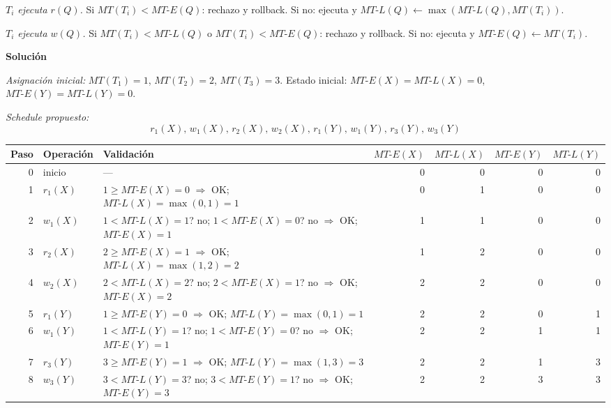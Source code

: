 \documentclass[11pt,a4paper]{article}
\newcommand{\itemcabecera}[1]{\noindent\textbf{#1}\par\medskip}
\newcommand{\bloqueSolucion}{\itemcabecera{Soluci\'on}}
\begin{document}
\textit{$T_i$ ejecuta $r(Q)$.} Si $MT(T_i) < MT\text{-}E(Q)$: rechazo y rollback. Si no: ejecuta y $MT\text{-}L(Q) \gets \max(MT\text{-}L(Q), MT(T_i))$.

\textit{$T_i$ ejecuta $w(Q)$.} Si $MT(T_i) < MT\text{-}L(Q)$ o $MT(T_i) < MT\text{-}E(Q)$: rechazo y rollback. Si no: ejecuta y $MT\text{-}E(Q) \gets MT(T_i)$.

\bloqueSolucion

\textit{Asignación inicial:} $MT(T_1) = 1$, $MT(T_2) = 2$, $MT(T_3) = 3$. Estado inicial: $MT\text{-}E(X) = MT\text{-}L(X) = 0$, $MT\text{-}E(Y) = MT\text{-}L(Y) = 0$.

\textit{Schedule propuesto:}
\[
r_1(X),\, w_1(X),\, r_2(X),\, w_2(X),\, r_1(Y),\, w_1(Y),\, r_3(Y),\, w_3(Y)
\]

\begin{center}
\begin{tabular}{r l l rrrr}
\toprule
\multicolumn{1}{c}{Paso} & Operación & Validación &
$\!MT\text{-}E(X)\!$ & $\!MT\text{-}L(X)\!$ & $\!MT\text{-}E(Y)\!$ & $\!MT\text{-}L(Y)\!$ \\
\midrule
0 & inicio       & ---                                                        & 0 & 0 & 0 & 0 \\
1 & $r_1(X)$     & $1 \ge MT\text{-}E(X){=}0$ $\Rightarrow$ OK; $MT\text{-}L(X){=}\max(0,1){=}1$ & 0 & 1 & 0 & 0 \\
2 & $w_1(X)$     & $1 < MT\text{-}L(X){=}1$? no; $1 < MT\text{-}E(X){=}0$? no $\Rightarrow$ OK; $MT\text{-}E(X){=}1$ & 1 & 1 & 0 & 0 \\
3 & $r_2(X)$     & $2 \ge MT\text{-}E(X){=}1$ $\Rightarrow$ OK; $MT\text{-}L(X){=}\max(1,2){=}2$ & 1 & 2 & 0 & 0 \\
4 & $w_2(X)$     & $2 < MT\text{-}L(X){=}2$? no; $2 < MT\text{-}E(X){=}1$? no $\Rightarrow$ OK; $MT\text{-}E(X){=}2$ & 2 & 2 & 0 & 0 \\
5 & $r_1(Y)$     & $1 \ge MT\text{-}E(Y){=}0$ $\Rightarrow$ OK; $MT\text{-}L(Y){=}\max(0,1){=}1$ & 2 & 2 & 0 & 1 \\
6 & $w_1(Y)$     & $1 < MT\text{-}L(Y){=}1$? no; $1 < MT\text{-}E(Y){=}0$? no $\Rightarrow$ OK; $MT\text{-}E(Y){=}1$ & 2 & 2 & 1 & 1 \\
7 & $r_3(Y)$     & $3 \ge MT\text{-}E(Y){=}1$ $\Rightarrow$ OK; $MT\text{-}L(Y){=}\max(1,3){=}3$ & 2 & 2 & 1 & 3 \\
8 & $w_3(Y)$     & $3 < MT\text{-}L(Y){=}3$? no; $3 < MT\text{-}E(Y){=}1$? no $\Rightarrow$ OK; $MT\text{-}E(Y){=}3$ & 2 & 2 & 3 & 3 \\
\bottomrule
\end{tabular}
\end{center}
\end{document}
